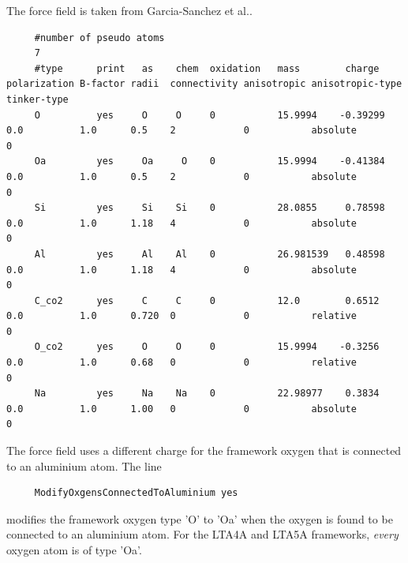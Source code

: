 \noindent
The force field is taken from Garcia-Sanchez et al.\cite{GarciaSanchez2009}.
\begin{tiny}
\begin{verbatim}
     #number of pseudo atoms
     7
     #type      print   as    chem  oxidation   mass        charge   polarization B-factor radii  connectivity anisotropic anisotropic-type   tinker-type
     O          yes     O     O     0           15.9994    -0.39299  0.0          1.0      0.5    2            0           absolute           0
     Oa         yes     Oa     O    0           15.9994    -0.41384  0.0          1.0      0.5    2            0           absolute           0
     Si         yes     Si    Si    0           28.0855     0.78598  0.0          1.0      1.18   4            0           absolute           0
     Al         yes     Al    Al    0           26.981539   0.48598  0.0          1.0      1.18   4            0           absolute           0
     C_co2      yes     C     C     0           12.0        0.6512   0.0          1.0      0.720  0            0           relative           0
     O_co2      yes     O     O     0           15.9994    -0.3256   0.0          1.0      0.68   0            0           relative           0
     Na         yes     Na    Na    0           22.98977    0.3834   0.0          1.0      1.00   0            0           absolute           0
\end{verbatim}
\end{tiny}
The force field uses a different charge for the framework oxygen that is connected to an aluminium atom.
The line
\begin{tiny}
\begin{verbatim}
     ModifyOxgensConnectedToAluminium yes
\end{verbatim}
\end{tiny}
modifies the framework oxygen type 'O' to 'Oa' when the oxygen is found to be connected to an aluminium atom.
For the LTA4A and LTA5A frameworks, \emph{every} oxygen atom is of type 'Oa'.

